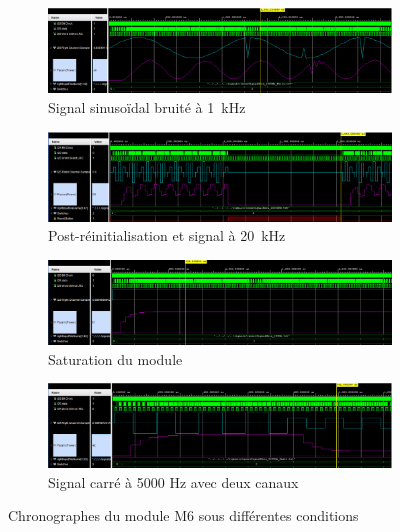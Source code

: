 \begin{figure}[H]
  \centering
  \begin{subfigure}{.496\linewidth}
    \centering
    \includegraphics[width=\textwidth]{assets/chrono-m6-1000hz-sin-noisy.png}
    \caption{Signal sinusoïdal bruité à \SI{1}{\kilo\hertz}}
    \label{fig:chrono-m6-1000hz-sin-noisy}
  \end{subfigure}
  \begin{subfigure}{.496\linewidth}
    \centering
    \includegraphics[width=\textwidth]{assets/chrono-m6-reset-and-20000hz.png}
    \caption{Post-réinitialisation et signal à \SI{20}{\kilo\hertz}}
    \label{fig:chrono-m6-reset-and-20000hz}
  \end{subfigure}
  \begin{subfigure}{.496\linewidth}
    \centering
    \includegraphics[width=\textwidth]{assets/chrono-m6-saturation-works.png}
    \caption{Saturation du module}
    \label{fig:chrono-m6-saturation-works}
  \end{subfigure}
  \begin{subfigure}{.496\linewidth}
    \centering
    \includegraphics[width=\textwidth]{assets/chrono-m6-square-5000hz-2in1.png}
    \caption{Signal carré à 5000 Hz avec deux canaux}
    \label{fig:chrono-m6-square-5000hz-2in1}
  \end{subfigure}
  \caption{Chronographes du module M6 sous différentes conditions}
\end{figure}

